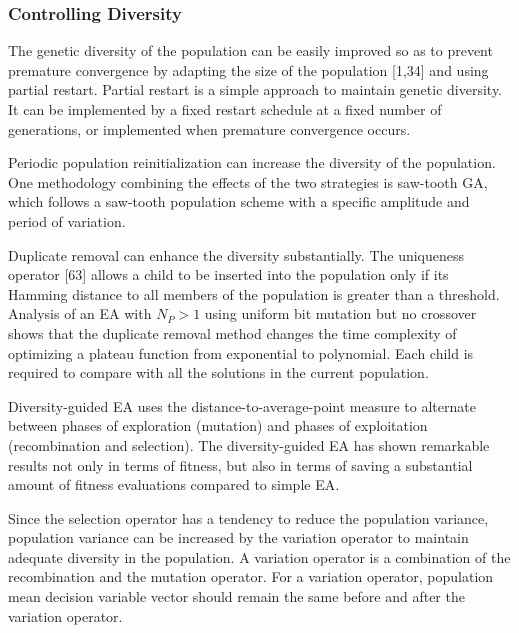 \documentclass[14pt]{article}
\numberwithin{equation}{subsection}
\begin{document}
			\subsubsection{Controlling Diversity}The genetic diversity of the population can be easily improved so as to
			prevent premature convergence by adapting the size of the population [1,34] and using partial restart.
			Partial restart is a simple approach to maintain genetic diversity. It can be implemented by a fixed restart
			schedule at a fixed number of generations, or implemented when premature convergence occurs. \par
			Periodic population reinitialization can increase the diversity of the population. One methodology combining
			the effects of the two strategies is saw-tooth GA, which follows a saw-tooth population scheme with a
			specific amplitude and period of variation. \par
			Duplicate removal can enhance the diversity substantially. The uniqueness operator [63] allows a child to be
			inserted into the population only if its Hamming distance to all members of the population is greater than a
			threshold. Analysis of an EA with $N_P > 1$ using uniform bit mutation but no crossover shows that the
			duplicate removal method changes the time complexity of optimizing a plateau function from exponential to
			polynomial. Each child is required to compare with all the solutions in the current population. \par
			Diversity-guided EA uses the distance-to-average-point measure to alternate between phases of
			exploration (mutation) and phases of exploitation (recombination and selection). The diversity-guided EA has
			shown remarkable results not only in terms of fitness, but also in terms of saving a substantial amount of
			fitness evaluations compared to simple EA. \par
			Since the selection operator has a tendency to reduce the population variance, population variance can be
			increased by the variation operator to maintain adequate diversity in the population. A variation operator
			is a combination of the recombination and the mutation operator. For a variation operator, population mean
			decision variable vector should remain the same before and after the variation operator.
			
\end{document}
